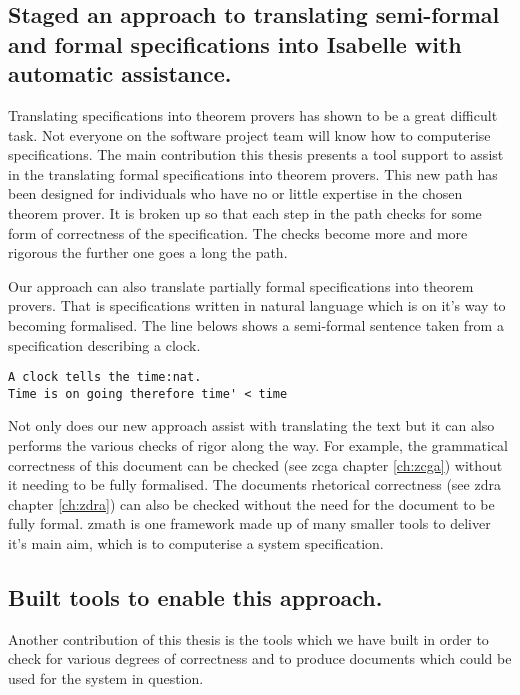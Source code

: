 \subsection{Staged an approach to translating semi-formal and formal specifications into Isabelle with automatic assistance.}

Translating specifications into theorem provers has shown to be a great difficult task. Not everyone on the software project team will know how to computerise specifications. The main contribution this thesis presents a tool support to assist in the translating formal specifications into theorem provers. This new path has been designed for individuals who have no or little expertise in the chosen theorem prover. It is broken up so that each step in the path checks for some form of correctness of the specification. The checks become more and more rigorous the further one goes a long the path.

Our approach can also translate partially formal specifications into theorem provers. That is specifications written in natural language which is on it's way to becoming formalised. The line belows shows a semi-formal sentence taken from a specification describing a clock.

\begin{verbatim}
A clock tells the time:nat.
Time is on going therefore time' < time
\end{verbatim}

Not only does our new approach assist with translating the text but it can also performs the various checks of rigor along the way. For example, the grammatical correctness of this document can be checked (see \gls{zcga} chapter \ref{ch:zcga}) without it needing to be fully formalised. The documents rhetorical correctness (see \gls{zdra} chapter \ref{ch:zdra}) can also be checked without the need for the document to be fully formal. \Gls{zmath} is one framework made up of many smaller tools to deliver it's main aim, which is to computerise a system specification.

\subsection{Built tools to enable this approach.}

Another contribution of this thesis is the tools which we have built in order to check for various degrees of correctness and to produce documents which could be used for the system in question.

